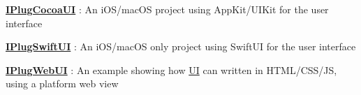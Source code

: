 \begin{DoxyItemize}
\item {\bfseries{\mbox{\hyperlink{class_i_plug_cocoa_u_i}{I\+Plug\+Cocoa\+UI}}}} \+: An i\+O\+S/mac\+OS project using App\+Kit/\+U\+I\+Kit for the user interface
\item {\bfseries{\mbox{\hyperlink{class_i_plug_swift_u_i}{I\+Plug\+Swift\+UI}}}} \+: An i\+O\+S/mac\+OS only project using Swift\+UI for the user interface
\item {\bfseries{\mbox{\hyperlink{class_i_plug_web_u_i}{I\+Plug\+Web\+UI}}}} \+: An example showing how \mbox{\hyperlink{class_u_i}{UI}} can written in H\+T\+M\+L/\+C\+S\+S/\+JS, using a platform web view 
\end{DoxyItemize}